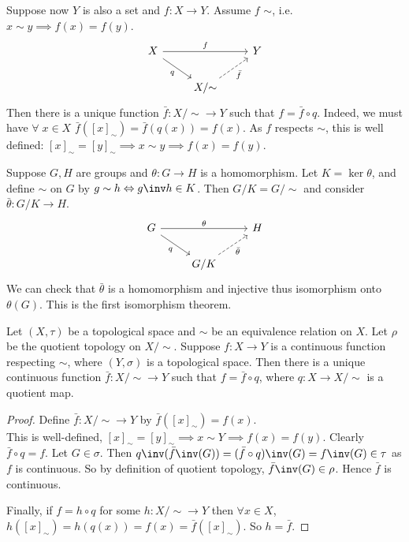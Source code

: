 Suppose now $Y$ is also a set and $f:X\to Y$. Assume $f$  $\sim$, i.e. $x\sim y \implies f(x) = f(y)$. 
\[\begin{tikzcd}
	X && Y \\
	& {X/ {\sim}}
	\arrow["q"', from=1-1, to=2-2]
	\arrow["{\bar{f}}"', dashed, from=2-2, to=1-3]
	\arrow["f", from=1-1, to=1-3]
\end{tikzcd}\]
Then there is a unique function $\bar{f}: X/ {\sim} \to Y$ such that $f = \bar{f}\circ q$.
Indeed, we must have $\forall \; x \in X$ $\bar{f}([x]_\sim) = \bar{f}(q(x)) = f(x)$.
As $f$ respects $\sim$, this is well defined: $[x]_\sim = [y]_\sim \implies x \sim y \implies f(x) = f(y)$.

\begin{example}
Suppose $G,H$ are groups and $\theta: G\to H$ is a homomorphism. Let $K = \ker\theta$, and define $\sim$ on $G$ by $g\sim h\Leftrightarrow g\inv h\in K$. Then $G/K = G/ {\sim}$ and consider $\bar{\theta}: G/K\to H$. 
\[\begin{tikzcd}
	G & {} & H \\
	& {G / K}
	\arrow["q"', from=1-1, to=2-2]
	\arrow["{\bar{\theta}}"', dashed, from=2-2, to=1-3]
	\arrow["\theta", from=1-1, to=1-3]
\end{tikzcd}\]
We can check that $\bar{\theta}$ is a homomorphism and injective thus isomorphism onto $\theta(G)$. This is the first isomorphism theorem.
\end{example}

\begin{proposition} \label{prp:40}                               
    Let $(X,\tau)$ be a topological space and $\sim$ be an equivalence relation on $X$. Let $\rho$ be the quotient topology on $X/ {\sim}$. Suppose $f: X\to Y$ is a continuous function respecting $\sim$, where $(Y,\sigma)$ is a topological space. Then there is a unique continuous function $\bar{f}:X/ {\sim}\to Y$ such that $f = \bar{f}\circ q$, where $q: X\to X/ {\sim}$ is a quotient map.
\end{proposition}

\begin{proof}
Define $\bar{f}: X/ {\sim}\to Y$ by $\bar{f}([x]_\sim) = f(x)$. \\
This is well-defined, $[x]_\sim = [y]_\sim \implies x\sim Y \implies f(x) = f(y)$. 
Clearly $\bar{f}\circ q=f$.
Let $G\in \sigma$. Then $q\inv(\bar{f}\inv(G)) = (\bar{f}\circ q)\inv (G) = f\inv (G)\in \tau$ as $f$ is continuous. 
So by definition of quotient topology, $\bar{f}\inv(G)\in \rho$. 
Hence $\bar{f}$ is continuous.

Finally, if $f = h \circ q$ for some $h:X/ {\sim}\to Y$ then $\forall x\in X$, $h([x]_\sim) = h(q(x)) = f(x) =\bar{f}([x]_\sim)$. So $h = \bar{f}$.
\end{proof}

